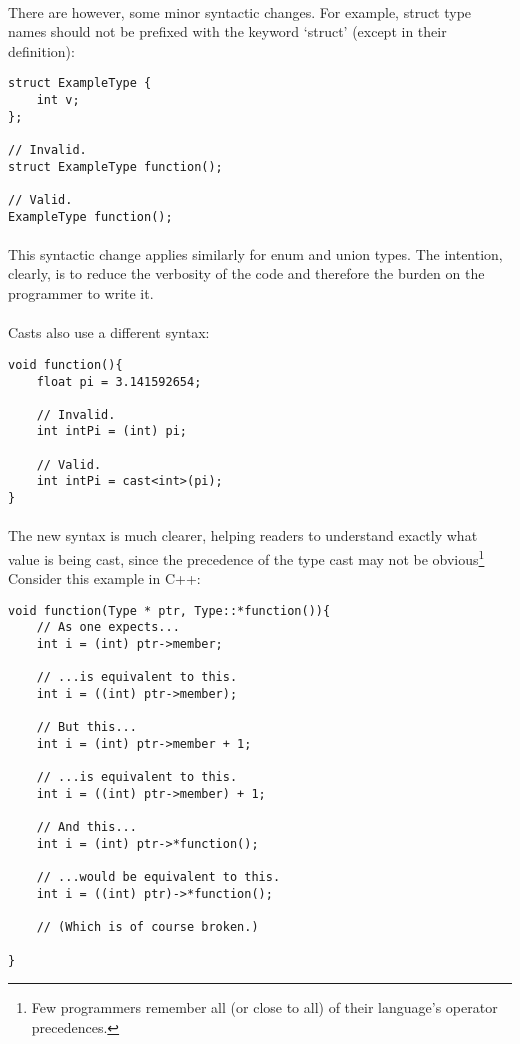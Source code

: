 \documentclass[12pt,twoside,notitlepage]{report}
\begin{document}
\paragraph{}
There are however, some minor syntactic changes. For example, struct type names should not be prefixed with the keyword `struct' (except in their definition):

\begin{lstlisting}
struct ExampleType {
	int v;
};

// Invalid.
struct ExampleType function();

// Valid.
ExampleType function();
\end{lstlisting}

\paragraph{}
This syntactic change applies similarly for enum and union types. The intention, clearly, is to reduce the verbosity of the code and therefore the burden on the programmer to write it.

\paragraph{}
Casts also use a different syntax:

\begin{lstlisting}
void function(){
	float pi = 3.141592654;
	
	// Invalid.
	int intPi = (int) pi;
	
	// Valid.
	int intPi = cast<int>(pi);
}
\end{lstlisting}

\paragraph{}
The new syntax is much clearer, helping readers to understand exactly what value is being cast, since the precedence of the type cast may not be obvious\footnote{Few programmers remember all (or close to all) of their language's operator precedences.} Consider this example in C++:

\begin{lstlisting}
void function(Type * ptr, Type::*function()){
	// As one expects...
	int i = (int) ptr->member;
	
	// ...is equivalent to this.
	int i = ((int) ptr->member);
	
	// But this...
	int i = (int) ptr->member + 1;
	
	// ...is equivalent to this.
	int i = ((int) ptr->member) + 1;
	
	// And this...
	int i = (int) ptr->*function();
	
	// ...would be equivalent to this.
	int i = ((int) ptr)->*function();
	
	// (Which is of course broken.)
	
}
\end{lstlisting}
\end{document}
